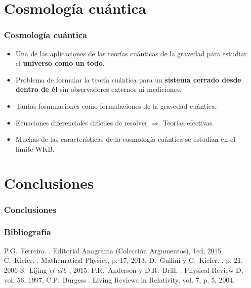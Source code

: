 \documentclass{beamer}
\begin{document}
\section{Cosmología cuántica}
\begin{frame}
\frametitle{Cosmología cuántica}
\begin{itemize}
 \item Una de las aplicaciones de las teorías cuánticas de la gravedad para estudiar el \textbf{universo como un todo}.
 \item Problema de formular la teoría cuántica para un \textbf{sistema cerrado desde dentro de él} sin observadores externos ni mediciones.
 \item Tantas formulaciones como formulaciones de la gravedad cuántica.
 \item Ecuaciones diferenciales difíciles de resolver $\Rightarrow$ Teorías efectivas.
 \item Muchas de las características de la cosmología cuántica se estudian en el límite WKB.
\end{itemize}



\end{frame}

\section{Conclusiones}
\begin{frame}
\frametitle{Conclusiones}

\end{frame}

\begin{frame}[allowframebreaks]
  \frametitle<presentation>{Bibliografía}    
  \begin{thebibliography}{10}    
  \beamertemplatebookbibitems
    P.G.~Ferreira.
    .
    \newblock Editorial Anagrama (Colección Argumentos), 1ed, 2015.
  \beamertemplatearticlebibitems
    C.~Kiefer.
    .
    \newblock Mathematical Physics, p. 17, 2013.
    D.~Guilini y C.~Kiefer.
    .
    \newblock p. 21, 2006
    S.~Lijing {\em et all}.
    , 2015.
    P.R.~Anderson y D.R.~Brill.
    .
    \newblock Physical Review D, vol. 56, 1997.
    C.P.~Burgess
    .
    \newblock Living Reviews in Relativity, vol. 7, p. 5, 2004.
  \end{thebibliography}
\end{frame}
\end{document}
